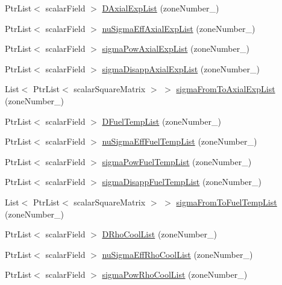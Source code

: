 \begin{DoxyCompactItemize}
\item 
Ptr\+List$<$ scalar\+Field $>$ \hyperlink{readNuclearData_8H_a81cc11116f227693480b0fb15230836e}{D\+Axial\+Exp\+List} (zone\+Number\+\_\+)
\item 
Ptr\+List$<$ scalar\+Field $>$ \hyperlink{readNuclearData_8H_a8023ea049e0382517d5eadb06b9aba84}{nu\+Sigma\+Eff\+Axial\+Exp\+List} (zone\+Number\+\_\+)
\item 
Ptr\+List$<$ scalar\+Field $>$ \hyperlink{readNuclearData_8H_a48a08cc967cf6bde7bf51693cfa0c509}{sigma\+Pow\+Axial\+Exp\+List} (zone\+Number\+\_\+)
\item 
Ptr\+List$<$ scalar\+Field $>$ \hyperlink{readNuclearData_8H_ad0a2d82c535bddd6a26430df9162b0a2}{sigma\+Disapp\+Axial\+Exp\+List} (zone\+Number\+\_\+)
\item 
List$<$ Ptr\+List$<$ scalar\+Square\+Matrix $>$ $>$ \hyperlink{readNuclearData_8H_ae3b66677b938cea91100197a993c0be5}{sigma\+From\+To\+Axial\+Exp\+List} (zone\+Number\+\_\+)
\item 
Ptr\+List$<$ scalar\+Field $>$ \hyperlink{readNuclearData_8H_a6978e2b2f5467a87966d45cbf0c4c639}{D\+Fuel\+Temp\+List} (zone\+Number\+\_\+)
\item 
Ptr\+List$<$ scalar\+Field $>$ \hyperlink{readNuclearData_8H_a809ec1538e95a1b3138e0f7ac7abeb6c}{nu\+Sigma\+Eff\+Fuel\+Temp\+List} (zone\+Number\+\_\+)
\item 
Ptr\+List$<$ scalar\+Field $>$ \hyperlink{readNuclearData_8H_a88e8c2024bcad8a75bc4741e435662d3}{sigma\+Pow\+Fuel\+Temp\+List} (zone\+Number\+\_\+)
\item 
Ptr\+List$<$ scalar\+Field $>$ \hyperlink{readNuclearData_8H_a8570c829c55376df41f67a186ec91bf0}{sigma\+Disapp\+Fuel\+Temp\+List} (zone\+Number\+\_\+)
\item 
List$<$ Ptr\+List$<$ scalar\+Square\+Matrix $>$ $>$ \hyperlink{readNuclearData_8H_a7a512ab1139eb59d9a462aff49587bd0}{sigma\+From\+To\+Fuel\+Temp\+List} (zone\+Number\+\_\+)
\item 
Ptr\+List$<$ scalar\+Field $>$ \hyperlink{readNuclearData_8H_a80c69533a883cb75133bf44d1ab082fe}{D\+Rho\+Cool\+List} (zone\+Number\+\_\+)
\item 
Ptr\+List$<$ scalar\+Field $>$ \hyperlink{readNuclearData_8H_ace6a4873e7010cc1830544f8d535616b}{nu\+Sigma\+Eff\+Rho\+Cool\+List} (zone\+Number\+\_\+)
\item 
Ptr\+List$<$ scalar\+Field $>$ \hyperlink{readNuclearData_8H_a33da238d86d5b52bcf74e78b450715f7}{sigma\+Pow\+Rho\+Cool\+List} (zone\+Number\+\_\+)
\item 

\end{DoxyCompactItemize}
